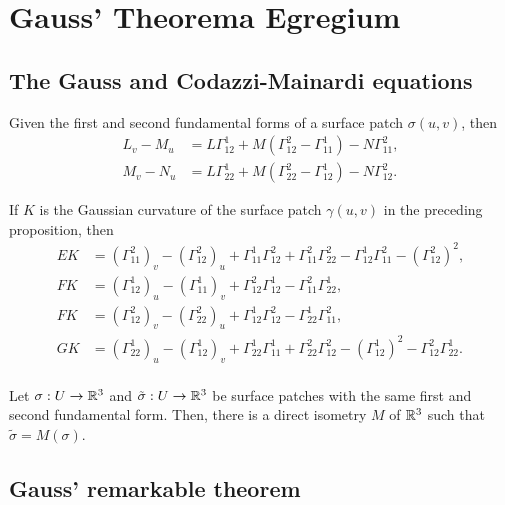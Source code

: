 \section{Gauss' Theorema Egregium}

\subsection{The Gauss and Codazzi-Mainardi equations}

\begin{proposition}
  Given the first and second fundamental forms of a surface patch
  $\sigma(u, v)$, then
  \begin{align*}
    L_v - M_u &= L \Gamma_{12}^1 + M(\Gamma_{12}^2 - \Gamma_{11}^1) - N \Gamma_{11}^2,\\
    M_v - N_u &= L \Gamma_{22}^1 + M(\Gamma_{22}^2 - \Gamma_{12}^1) - N \Gamma_{12}^2.
  \end{align*}
\end{proposition}

\begin{proposition}
  If $K$ is the Gaussian curvature of the surface patch $\gamma(u, v)$
  in the preceding proposition, then
  \begin{align*}
    EK &= (\Gamma_{11}^2)_v - (\Gamma_{12}^2)_u + \Gamma_{11}^1 \Gamma_{12}^2 +
    \Gamma_{11}^2 \Gamma_{22}^2 - \Gamma_{12}^1 \Gamma_{11}^2 - (\Gamma_{12}^2)^2, \\
    FK &= (\Gamma_{12}^1)_u - (\Gamma_{11}^1)_v + \Gamma_{12}^2 \Gamma_{12}^1 - \Gamma_{11}^2 \Gamma_{22}^1, \\
    FK &= (\Gamma_{12}^2)_v - (\Gamma_{22}^2)_u + \Gamma_{12}^1 \Gamma_{12}^2 - \Gamma_{22}^1 \Gamma_{11}^2, \\
    GK &= (\Gamma_{22}^1)_u - (\Gamma_{12}^1)_v + \Gamma_{22}^1 \Gamma_{11}^1 +
    \Gamma_{22}^2 \Gamma_{12}^2 - (\Gamma_{12}^1)^2 - \Gamma_{12}^2 \Gamma_{22}^1. \\
  \end{align*}
\end{proposition}

\begin{theorem}
  Let $\sigma: U \to \mathbb{R}^3$ and $\tilde \sigma: U \to \mathbb{R}^3$ be surface patches with the same
  first and second fundamental form. Then, there is a direct isometry $M$ of $\mathbb{R}^3$ such that $\tilde \sigma = M(\sigma)$.
\end{theorem}

\subsection{Gauss' remarkable theorem}

